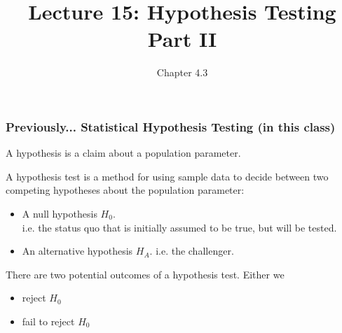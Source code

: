 \documentclass[handout]{beamer}
\title{Lecture 15: Hypothesis Testing Part II}
\author{Chapter 4.3}
\date{}
\newcommand{\blue}[1]{\textcolor{blue2}{#1}}
\begin{document}
\begin{frame}
\titlepage
\end{frame}


\begin{frame}
\frametitle{Previously... Statistical Hypothesis Testing (in this class)}
A \blue{hypothesis} is a claim about a population parameter. 

\vspace{0.25cm}

A \blue{hypothesis test} is a method for using sample data to decide between two competing hypotheses about the population parameter:
\begin{itemize}
\item A \blue{null hypothesis $H_0$}.\\
i.e. the \blue{status quo} that is initially assumed to be true, but will be tested. 
\item An \blue{alternative hypothesis $H_A$}. i.e. the \blue{challenger}.
\end{itemize}

\vspace{0.25cm}

There are two potential outcomes of a hypothesis test.  Either we
\begin{itemize}
\item reject $H_0$  
\item fail to reject $H_0$
\end{itemize}
\end{frame}
\end{document}
